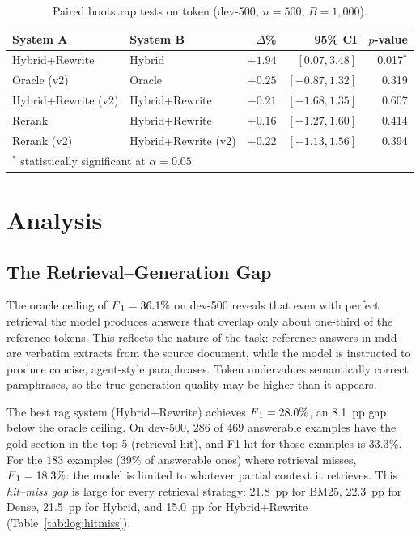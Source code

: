 \begin{table}[ht]
    \centering
    \caption{Paired bootstrap tests on token \fone{} (dev-500, $n = 500$, $B = 1{,}000$).}
    \label{tab:rag:paired}
    \begin{tabular}{llrrr}
        \toprule
        System A & System B & $\Delta$\fone{}\% & 95\% CI & $p$-value \\
        \midrule
        Hybrid+Rewrite      & Hybrid            & $+1.94$ & $[0.07, 3.48]$  & 0.017$^*$ \\
        Oracle (v2)         & Oracle            & $+0.25$ & $[-0.87, 1.32]$ & 0.319 \\
        Hybrid+Rewrite (v2) & Hybrid+Rewrite    & $-0.21$ & $[-1.68, 1.35]$ & 0.607 \\
        Rerank              & Hybrid+Rewrite    & $+0.16$ & $[-1.27, 1.60]$ & 0.414 \\
        Rerank (v2)         & Hybrid+Rewrite (v2) & $+0.22$ & $[-1.13, 1.56]$ & 0.394 \\
        \bottomrule
        \multicolumn{5}{l}{\small $^*$ statistically significant at $\alpha = 0.05$}
    \end{tabular}
\end{table}


\section{Analysis}\label{sec:rag:analysis}

\subsection{The Retrieval--Generation Gap}

The oracle ceiling of $F\textsubscript{1} = 36.1\%$ on dev-500 reveals that even with perfect
retrieval the model produces answers that overlap only about one-third of the
reference tokens. This reflects the nature of the task: reference answers in
\gls{mdd} are verbatim extracts from the source document, while the model is
instructed to produce concise, agent-style paraphrases. Token \fone{} undervalues
semantically correct paraphrases, so the true generation quality may be higher than
it appears.

The best \gls{rag} system (Hybrid+Rewrite) achieves $F\textsubscript{1} = 28.0\%$, an 8.1~pp
gap below the oracle ceiling. On dev-500, $286$ of $469$ answerable examples have
the gold section in the top-5 (retrieval hit), and F1-hit for those examples is
33.3\%. For the $183$ examples (39\% of answerable ones) where retrieval misses,
$F\textsubscript{1} = 18.3\%$: the model is limited to whatever partial context it retrieves.
This \emph{hit--miss gap} is large for every retrieval strategy: 21.8~pp for BM25,
22.3~pp for Dense, 21.5~pp for Hybrid, and 15.0~pp for Hybrid+Rewrite
(Table~\ref{tab:log:hitmiss}).

